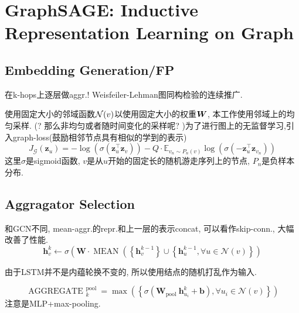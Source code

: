 \documentclass{article}
\begin{document}
\section{GraphSAGE: Inductive Representation Learning on Graph}

\subsection{Embedding Generation/FP}

     在k-hops上逐层做aggr.! Weisfeiler-Lehman图同构检验的连续推广.


    使用固定大小的邻域函数$\cal N(v)$以使用固定大小的权重$\bs{W}$, 本工作使用邻域上的均匀采样. (? 那么非均匀或者随时间变化的采样呢? )为了进行图上的无监督学习,引入graph-loss(鼓励相邻节点具有相似的学到的表示)
    \begin{equation}
        J_{\mathcal{G}}\left(\mathbf{z}_{u}\right)=-\log \left(\sigma\left(\mathbf{z}_{u}^{\top} \mathbf{z}_{v}\right)\right)-Q \cdot \mathbb{E}_{v_{n} \sim P_{n}(v)} \log \left(\sigma\left(-\mathbf{z}_{u}^{\top} \mathbf{z}_{v_{n}}\right)\right)
    \end{equation}
    这里$\sigma$是sigmoid函数, $v$是从$u$开始的固定长的随机游走序列上的节点, $P_n$是负样本分布.

\subsection{Aggragator Selection}

     和GCN不同, mean-aggr.的repr.和上一层的表示concat, 可以看作skip-conn., 大幅改善了性能.
    \begin{equation}
        \mathbf{h}_{v}^{k} \leftarrow \sigma\left(\mathbf{W} \cdot \operatorname{MEAN}\left(\left\{\mathbf{h}_{v}^{k-1}\right\} \cup\left\{\mathbf{h}_{u}^{k-1}, \forall u \in \mathcal{N}(v)\right\}\right)\right.
    \end{equation}

     由于LSTM并不是内蕴轮换不变的, 所以使用结点的随机打乱作为输入.

     \begin{equation}
        \text { AGGREGATE }_{k}^{\text {pool }}=\max \left(\left\{\sigma\left(\mathbf{W}_{\text {pool }} \mathbf{h}_{u_{i}}^{k}+\mathbf{b}\right), \forall u_{i} \in \mathcal{N}(v)\right\}\right)
    \end{equation}
    注意是MLP+max-pooling.
\end{document}
